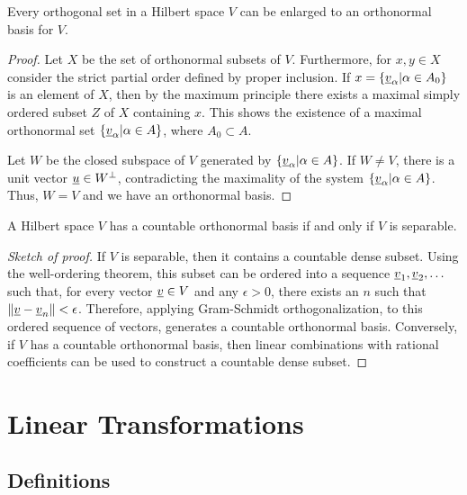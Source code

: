 \begin{theorem}
Every orthogonal set in a Hilbert space $V$ can be enlarged to an orthonormal basis for $V$.
\end{theorem}
\begin{proof}
Let $X$ be the set of orthonormal subsets of $V$.
Furthermore, for $x, y \in X$ consider the strict partial order defined by proper inclusion.
If $x = \left\{ \underline{v}_{\alpha} | \alpha \in A_0 \right\}$ is an element of $X$, then by the maximum principle there exists a maximal simply ordered subset $Z$ of $X$ containing $x$.
This shows the existence of a maximal orthonormal set $\left\{ \underline{v}_{\alpha} | \alpha \in A \right\}$, where $A_0 \subset A$.

Let $W$ be the closed subspace of $V$ generated by $\left\{ \underline{v}_{\alpha} | \alpha \in A \right\}$.
If $W \neq V$, there is a unit vector $\underline{u} \in W^{\bot}$, contradicting the maximality of the system $\left\{ \underline{v}_{\alpha} | \alpha \in A \right\}$.
Thus, $W = V$ and we have an orthonormal basis.
\end{proof}

\begin{theorem} \label{theorem:SeparableHilbertSpace}
A Hilbert space $V$ has a countable orthonormal basis if and only if $V$ is separable.
\end{theorem}
\begin{proof}[Sketch of proof]
If $V$ is separable, then it contains a countable dense subset.
Using the well-ordering theorem, this subset can be ordered into a sequence $\underline{v}_1 , \underline{v}_2 , \ldots$ such that, for every vector $\underline{v}\in V$ and any $\epsilon>0$, there exists an $n$ such that $\left\| \underline{v} - \underline{v}_n \right\| < \epsilon$.
Therefore, applying Gram-Schmidt orthogonalization, to this ordered sequence of vectors, generates a countable orthonormal basis.
Conversely, if $V$ has a countable orthonormal basis, then linear combinations with rational coefficients can be used to construct a countable dense subset.
\end{proof}

\section{Linear Transformations}

\subsection{Definitions}

